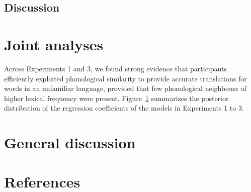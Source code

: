 \documentclass[
]{article}
\begin{document}
\subsection{Discussion}\label{discussion-2}

\section{Joint analyses}\label{joint-analyses}

Across Experiments 1 and 3, we found strong evidence that participants
efficiently exploited phonological similarity to provide accurate
translations for words in an unfamiliar language, provided that few
phonological neighbours of higher lexical frequency were present.
Figure~\ref{fig-coefs} summarizes the posterior distribution of the
regression coefficients of the models in Experiments 1 to 3.

\begin{figure}


\caption{\label{fig-coefs}}

\end{figure}%

\section{General discussion}\label{general-discussion}

\section{References}\label{references}
\end{document}
